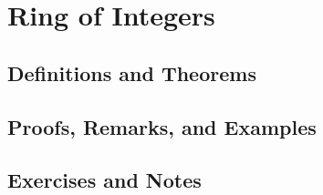 \chapter{Ring of Integers}
\section{Definitions and Theorems}
%
\newpage
\section{Proofs, Remarks, and Examples}

%
\newpage
\section{Exercises and Notes}